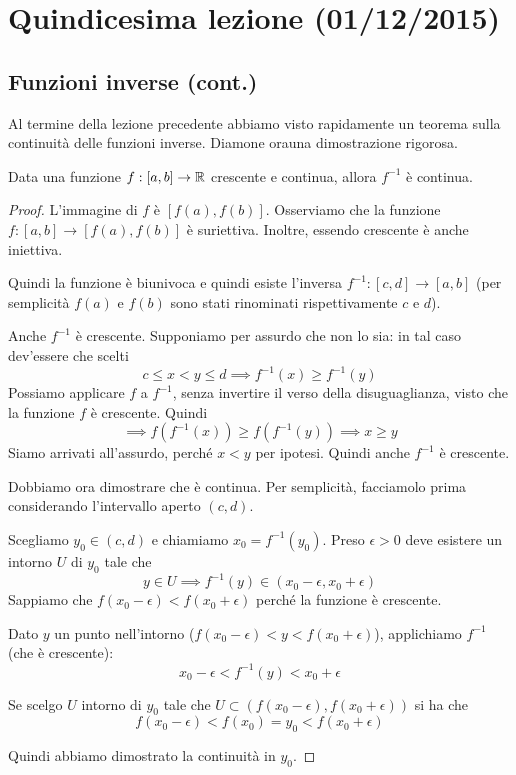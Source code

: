 \chapter{Quindicesima lezione (01/12/2015)}

\section{Funzioni inverse (cont.)}

Al termine della lezione precedente abbiamo visto rapidamente un teorema sulla continuità delle funzioni inverse. Diamone orauna dimostrazione rigorosa.
\begin{theorem}
Data una funzione $f: [a, b] \to \mathbb R$ crescente e continua, allora $f^{-1}$ è continua.
\end{theorem}
\begin{proof}
L'immagine di $f$ è $[f(a), f(b)]$. Osserviamo che la funzione $f: [a, b] \to [f(a), f(b)]$ è suriettiva. Inoltre, essendo crescente è anche iniettiva.

Quindi la funzione è biunivoca e quindi esiste l'inversa $f^{-1}:[c,d] \to [a, b]$ (per semplicità $f(a)$ e $f(b)$ sono stati rinominati rispettivamente $c$ e $d$).

Anche $f^{-1}$ è crescente. Supponiamo per assurdo che non lo sia: in tal caso dev'essere che scelti
\begin{equation*}
c \le x < y \le d \implies f^{-1}(x) \ge f^{-1}(y)
\end{equation*}
Possiamo applicare $f$ a $f^{-1}$, senza invertire il verso della disuguaglianza, visto che la funzione $f$ è crescente. Quindi
\begin{equation*}
\implies f(f^{-1}(x)) \ge f(f^{-1}(y)) \implies x \ge y
\end{equation*}
Siamo arrivati all'assurdo, perché $x < y$ per ipotesi. Quindi anche $f^{-1}$ è crescente.

Dobbiamo ora dimostrare che è continua. Per semplicità, facciamolo prima considerando l'intervallo aperto $(c, d)$. 

Scegliamo $y_0 \in (c,d)$ e chiamiamo $x_0 = f^{-1} (y_0)$. Preso $\epsilon > 0$ deve esistere un intorno $U$ di $y_0$ tale che
\begin{equation*}
y \in U \implies f^{-1} (y) \in (x_0 - \epsilon, x_0 + \epsilon)
\end{equation*}
Sappiamo che $f(x_0 - \epsilon) < f(x_0 + \epsilon)$ perché la funzione è crescente.

Dato $y$ un punto nell'intorno ($f(x_0 - \epsilon) < y < f(x_0 + \epsilon)$), applichiamo $f^{-1}$ (che è crescente):
\begin{equation*}
x_0 - \epsilon < f^{-1} (y) < x_0 + \epsilon
\end{equation*}

Se scelgo $U$ intorno di $y_0$ tale che $U \subset (f(x_0 - \epsilon), f(x_0 + \epsilon))$ si ha che
\begin{equation*}
f(x_0 - \epsilon) < f(x_0) = y_0 < f(x_0 + \epsilon)
\end{equation*}

Quindi abbiamo dimostrato la continuità in $y_0$.
\end{proof}

